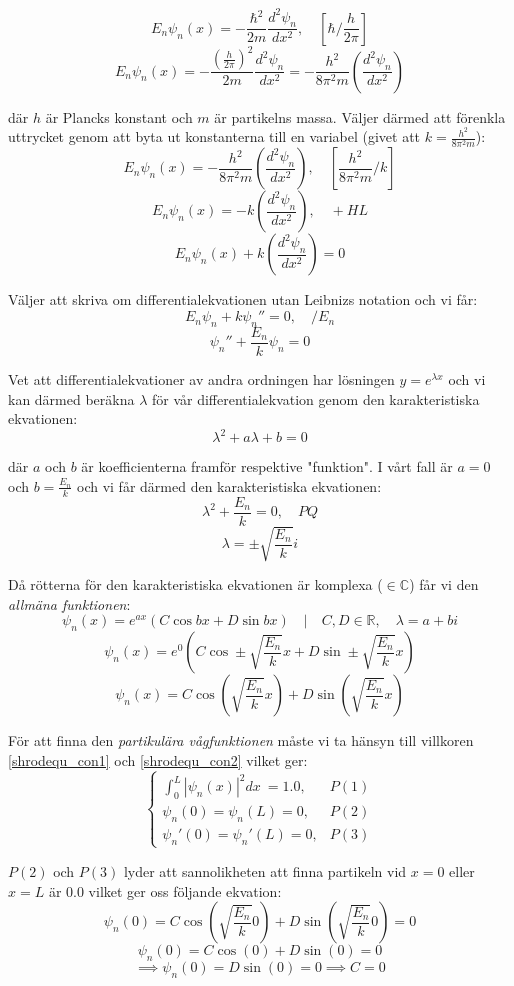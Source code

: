 \documentclass{article}
\newcommand{\shrodequ}{E_n \psi_n(x) = - \frac{\hbar^2}{2m} \frac{d^2 \psi_n}{dx^2}}
\newcommand{\shrodprob}{|\psi_n(x)|^2}
\begin{document}
$$
\shrodequ, \quad \left[\hbar / \frac{h}{2\pi}\right]
$$
$$
E_n\psi_n(x) = - \frac{\left(\frac{h}{2\pi}\right)^2}{2m} \frac{d^2 \psi_n}{dx^2} = - \frac{h^2}{8 \pi^2 m} \left(\frac{d^2 \psi_n}{dx^2}\right)
$$

där $h$ är Plancks konstant och $m$ är partikelns massa. Väljer därmed att förenkla uttrycket genom att byta ut konstanterna till en variabel (givet att $k = \frac{h^2}{8 \pi ^2 m}$):
$$
E_n\psi_n(x) = - \frac{h^2}{8 \pi ^2 m} \left(\frac{d^2 \psi_n}{dx^2}\right), \quad \left[\frac{h^2}{8 \pi ^2 m}/k\right]
$$
$$
E_n\psi_n(x) = -k\left(\frac{d^2 \psi_n}{dx^2}\right), \quad + HL
$$
$$
E_n\psi_n(x) + k\left(\frac{d^2 \psi_n}{dx^2}\right) = 0
$$

Väljer att skriva om differentialekvationen utan Leibnizs notation och vi får:
$$
E_n\psi_n + k \psi_n'' = 0, \quad /E_n 
$$
$$
\psi_n'' + \frac{E_n}{k}\psi_n = 0 
$$

Vet att differentialekvationer av andra ordningen har lösningen $y=e^{\lambda x}$ och vi kan därmed beräkna $\lambda$ för vår differentialekvation genom den karakteristiska ekvationen:
$$
\lambda^2 + a\lambda + b = 0
$$

där $a$ och $b$ är koefficienterna framför respektive "funktion". I vårt fall är $a=0$ och $b = \frac{E_n}{k}$ och vi får därmed den karakteristiska ekvationen:
$$
\lambda^2 + \frac{E_n}{k} = 0, \quad PQ	
$$
$$
\lambda = \pm \sqrt{\frac{E_n}{k}}i
$$

Då rötterna för den karakteristiska ekvationen är komplexa ($\in \mathbb{C}$) får vi den \emph{allmäna funktionen}:
$$
\psi_n(x) = e^{ax}\left(C \cos bx + D \sin bx\right) \quad | \quad C,D \in \mathbb{R}, \quad \lambda = a + bi
$$
$$
\psi_n(x) = e^{0}\left( C \cos \pm\sqrt{\frac{E_n}{k}}x + D \sin \pm\sqrt{\frac{E_n}{k}}x \right) 
$$
\begin{equation} \label{psi_gen}
\psi_n(x) = C \cos \left(\sqrt{\frac{E_n}{k}}x\right) + D \sin \left(\sqrt{\frac{E_n}{k}}x\right)
\end{equation}

För att finna den \emph{partikulära vågfunktionen} måste vi ta hänsyn till villkoren \ref{shrodequ_con1} och \ref{shrodequ_con2} vilket ger:
$$
\begin{cases}
	\int_0^L \shrodprob dx\ = 1.0, & P(1) \\
	\psi_n(0) = \psi_n(L) = 0, & P(2) \\
	\psi_n'(0) = \psi_n'(L) = 0, & P(3) 
\end{cases}
$$

$P(2)$ och $P(3)$ lyder att sannolikheten att finna partikeln vid $x=0$ eller $x=L$ är $0.0$ vilket ger oss följande ekvation:
$$
\psi_n(0) = C \cos \left(\sqrt{\frac{E_n}{k}}0\right) + D \sin \left(\sqrt{\frac{E_n}{k}}0\right) = 0
$$
$$
\psi_n(0) = C \cos \left(0\right) + D \sin \left(0\right) = 0
$$
$$
\implies \psi_n(0) = D \sin \left(0\right) = 0 \implies C = 0
$$
\end{document}
